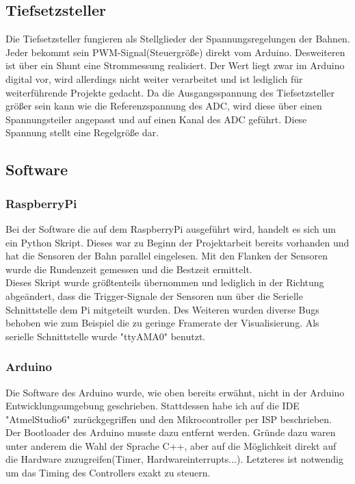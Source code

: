 \documentclass[a4paper, 11pt]{scrartcl}
\begin{document}
	\subsection{Tiefsetzsteller}
		Die Tiefsetzsteller fungieren als Stellglieder der Spannungsregelungen der Bahnen. Jeder bekommt sein PWM-Signal(Steuergröße) direkt vom Arduino. Desweiteren ist über ein Shunt eine Strommessung realisiert. Der Wert liegt zwar im Arduino digital vor, wird allerdings nicht weiter verarbeitet und ist lediglich für weiterführende Projekte gedacht. Da die Ausgangsspannung des Tiefsetzsteller größer sein kann wie die Referenzspannung des ADC, wird diese über einen Spannungsteiler angepasst und auf einen Kanal des ADC geführt. Diese Spannung stellt eine Regelgröße dar.
	\newpage
	\subsection{Software}
		\subsubsection{RaspberryPi}
			Bei der Software die auf dem RaspberryPi ausgeführt wird, handelt es sich um ein Python Skript. Dieses war zu Beginn der Projektarbeit bereits vorhanden und hat die Sensoren der Bahn parallel eingelesen. Mit den Flanken der Sensoren wurde die Rundenzeit gemessen und die Bestzeit ermittelt.\\
			Dieses Skript wurde größtenteils übernommen und lediglich in der Richtung abgeändert, dass die Trigger-Signale der Sensoren nun über die Serielle Schnittstelle dem Pi mitgeteilt wurden. Des Weiteren wurden diverse Bugs behoben wie zum Beispiel die zu geringe Framerate der Visualisierung. Als serielle Schnittstelle wurde "ttyAMA0" benutzt.
		\newpage
		\subsubsection{Arduino}
			Die Software des Arduino wurde, wie oben bereits erwähnt, nicht in der Arduino Entwicklungsumgebung geschrieben. Stattdessen habe ich auf die IDE "AtmelStudio6" zurückgegriffen und den Mikrocontroller per ISP beschrieben. Der Bootloader des Arduino musste dazu entfernt werden.
			Gründe dazu waren unter anderem die Wahl der Sprache C++, aber auf die Möglichkeit direkt auf die Hardware zuzugreifen(Timer, Hardwareinterrupts...). Letzteres ist notwendig um das Timing des Controllers exakt zu steuern.\\
\end{document}
